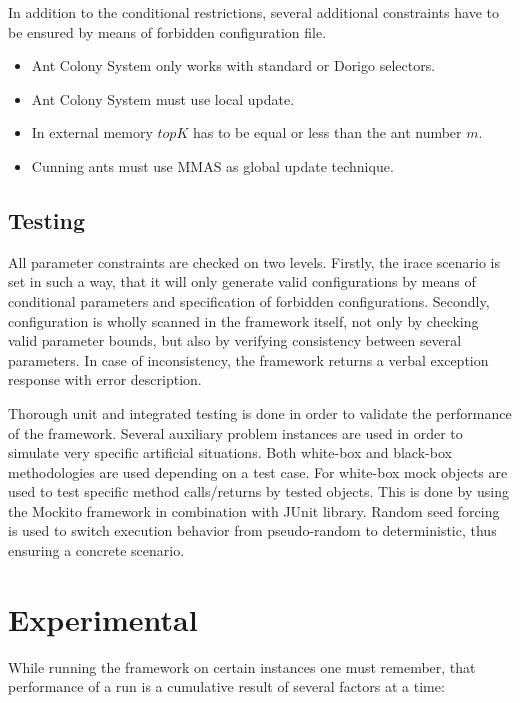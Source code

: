 \documentclass[11pt,a4paper,oneside]{book}
\begin{document}
In addition to the conditional restrictions, several additional constraints have to be ensured by means of forbidden configuration file.

\begin{itemize}
\item Ant Colony System only works with standard or Dorigo selectors.

\item Ant Colony System must use local update.

\item In external memory $topK$ has to be equal or less than the ant number $m$.

\item Cunning ants must use MMAS as global update technique.
\end{itemize}


\section{Testing}


All parameter constraints are checked on two levels. Firstly, the irace scenario is set in such a way, that it will only generate valid configurations by means of conditional parameters and specification of forbidden configurations. Secondly, configuration is wholly scanned in the framework itself, not only by checking valid parameter bounds, but also by verifying consistency between several parameters. In case of inconsistency, the framework returns a verbal exception response with error description.

Thorough unit and integrated testing is done in order to validate the performance of the framework. Several auxiliary problem instances are used in order to simulate very specific artificial situations. Both white-box and black-box methodologies are used depending on a test case. For white-box mock objects are used to test specific method calls/returns by tested objects. This is done by using the Mockito framework in combination with JUnit library. Random seed forcing is used to switch execution behavior
from pseudo-random to deterministic, thus ensuring a concrete scenario.

\chapter{Experimental}

While running the framework on certain instances one must remember, that performance of a run is a cumulative result of several factors at a time: 
\end{document}
